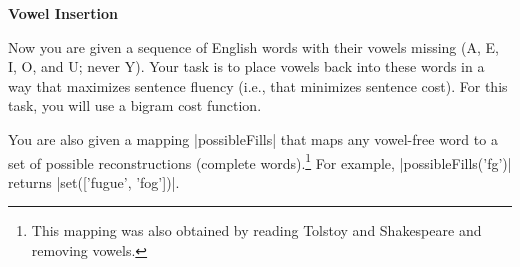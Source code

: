 \item {\bf Vowel Insertion}

Now you are given a sequence of English words with their vowels missing (A, E,
I, O, and U; never Y).  Your task is to place vowels back into these words in a
way that maximizes sentence fluency (i.e., that minimizes sentence cost).  For
this task, you will use a bigram cost function.

You are also given a mapping |possibleFills| that maps any vowel-free word to a
set of possible reconstructions (complete words).\footnote{This mapping was also
obtained by reading Tolstoy and Shakespeare and removing vowels.} For example,
|possibleFills('fg')| returns |set(['fugue', 'fog'])|.

\begin{enumerate}

  

  

  

\end{enumerate}
